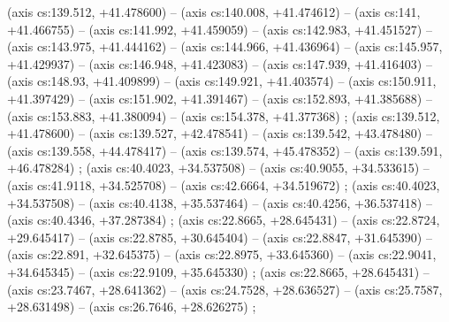     (axis cs:139.512,    +41.478600) --  (axis cs:140.008,    +41.474612) --  (axis cs:141,    +41.466755) --  (axis cs:141.992,    +41.459059) --  (axis cs:142.983,    +41.451527) --  (axis cs:143.975,    +41.444162) --  (axis cs:144.966,    +41.436964) --  (axis cs:145.957,    +41.429937) --  (axis cs:146.948,    +41.423083) --  (axis cs:147.939,    +41.416403) --  (axis cs:148.93,    +41.409899) --  (axis cs:149.921,    +41.403574) --  (axis cs:150.911,    +41.397429) --  (axis cs:151.902,    +41.391467) --  (axis cs:152.893,    +41.385688) --  (axis cs:153.883,    +41.380094) --  (axis cs:154.378,    +41.377368) ;
    (axis cs:139.512,    +41.478600) --  (axis cs:139.527,    +42.478541) --  (axis cs:139.542,    +43.478480) --  (axis cs:139.558,    +44.478417) --  (axis cs:139.574,    +45.478352) --  (axis cs:139.591,    +46.478284) ;
    (axis cs:40.4023,    +34.537508) --  (axis cs:40.9055,    +34.533615) --  (axis cs:41.9118,    +34.525708) --  (axis cs:42.6664,    +34.519672) ;
    (axis cs:40.4023,    +34.537508) --  (axis cs:40.4138,    +35.537464) --  (axis cs:40.4256,    +36.537418) --  (axis cs:40.4346,    +37.287384) ;
    (axis cs:22.8665,    +28.645431) --  (axis cs:22.8724,    +29.645417) --  (axis cs:22.8785,    +30.645404) --  (axis cs:22.8847,    +31.645390) --  (axis cs:22.891,    +32.645375) --  (axis cs:22.8975,    +33.645360) --  (axis cs:22.9041,    +34.645345) --  (axis cs:22.9109,    +35.645330) ;
    (axis cs:22.8665,    +28.645431) --  (axis cs:23.7467,    +28.641362) --  (axis cs:24.7528,    +28.636527) --  (axis cs:25.7587,    +28.631498) --  (axis cs:26.7646,    +28.626275) ;
  